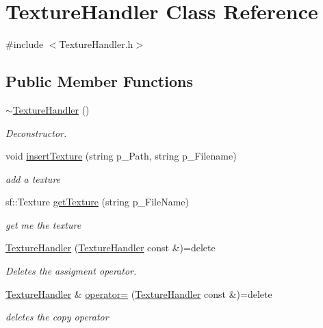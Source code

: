 \hypertarget{class_texture_handler}{}\section{Texture\+Handler Class Reference}
\label{class_texture_handler}


{\ttfamily \#include $<$Texture\+Handler.\+h$>$}

\subsection*{Public Member Functions}
\begin{DoxyCompactItemize}
\item 
\mbox{\label{class_texture_handler_a6c6cfe48db6e9b582bc29b44c37758e6}} 
\mbox{\hyperlink{class_texture_handler_a6c6cfe48db6e9b582bc29b44c37758e6}{$\sim$\+Texture\+Handler}} ()
\begin{DoxyCompactList}\small\item\em Deconstructor. \end{DoxyCompactList}\item 
\mbox{\label{class_texture_handler_ae3c5e0e1c61458009817ea91d4aa6eec}} 
void \mbox{\hyperlink{class_texture_handler_ae3c5e0e1c61458009817ea91d4aa6eec}{insert\+Texture}} (string p\+\_\+\+Path, string p\+\_\+\+Filename)
\begin{DoxyCompactList}\small\item\em add a texture \end{DoxyCompactList}\item 
sf\+::\+Texture \mbox{\hyperlink{class_texture_handler_a14f9286e41340937add40ec11453b2b4}{get\+Texture}} (string p\+\_\+\+File\+Name)
\begin{DoxyCompactList}\small\item\em get me the texture \end{DoxyCompactList}\item 
\mbox{\hyperlink{class_texture_handler_a1e980f198f0f1ec4bea0f670d8f72e88}{Texture\+Handler}} (\mbox{\hyperlink{class_texture_handler}{Texture\+Handler}} const \&)=delete
\begin{DoxyCompactList}\small\item\em Deletes the assigment operator. \end{DoxyCompactList}\item 
\mbox{\label{class_texture_handler_adb37fce7620b391fd3ee6b1c2d8596e5}} 
\mbox{\hyperlink{class_texture_handler}{Texture\+Handler}} \& \mbox{\hyperlink{class_texture_handler_adb37fce7620b391fd3ee6b1c2d8596e5}{operator=}} (\mbox{\hyperlink{class_texture_handler}{Texture\+Handler}} const \&)=delete
\begin{DoxyCompactList}\small\item\em deletes the copy operator \end{DoxyCompactList}\end{DoxyCompactItemize}
